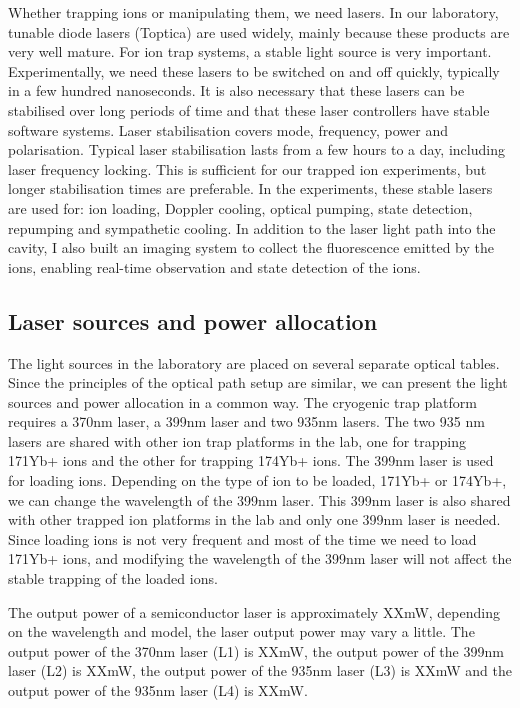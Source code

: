 Whether trapping ions or manipulating them, we need lasers. In our laboratory, tunable diode lasers (Toptica) are used widely, mainly because these products are very well mature. For ion trap systems, a stable light source is very important. Experimentally, we need these lasers to be switched on and off quickly, typically in a few hundred nanoseconds. It is also necessary that these lasers can be stabilised over long periods of time and that these laser controllers have stable software systems. Laser stabilisation covers mode, frequency, power and polarisation. Typical laser stabilisation lasts from a few hours to a day, including laser frequency locking. This is sufficient for our trapped ion experiments, but longer stabilisation times are preferable. In the experiments, these stable lasers are used for: ion loading, Doppler cooling, optical pumping, state detection, repumping and sympathetic cooling. In addition to the laser light path into the cavity, I also built an imaging system to collect the fluorescence emitted by the ions, enabling real-time observation and state detection of the ions.

\subsection{Laser sources and power allocation}

The light sources in the laboratory are placed on several separate optical tables. Since the principles of the optical path setup are similar, we can present the light sources and power allocation in a common way. The cryogenic trap platform requires a 370nm laser, a 399nm laser and two 935nm lasers. The two 935 nm lasers are shared with other ion trap platforms in the lab, one for trapping 171Yb+ ions and the other for trapping 174Yb+ ions. The 399nm laser is used for loading ions. Depending on the type of ion to be loaded, 171Yb+ or 174Yb+, we can change the wavelength of the 399nm laser. This 399nm laser is also shared with other trapped ion platforms in the lab and only one 399nm laser is needed. Since loading ions is not very frequent and most of the time we need to load 171Yb+ ions, and modifying the wavelength of the 399nm laser will not affect the stable trapping of the loaded ions.

The output power of a semiconductor laser is approximately XXmW, depending on the wavelength and model, the laser output power may vary a little. The output power of the 370nm laser (L1) is XXmW, the output power of the 399nm laser (L2) is XXmW, the output power of the 935nm laser (L3) is XXmW and the output power of the 935nm laser (L4) is XXmW.

